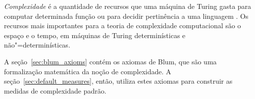 \emph{Complexidade} é a quantidade de recursos
que uma máquina de Turing gasta
para computar determinada função
ou para decidir pertinência a uma linguagem
\cite[p.~285]{HopcroftUllman1979}.
Os recursos mais importantes para a teoria de complexidade computacional
são o espaço e o tempo,
em máquinas de Turing determinísticas e não"=determinísticas.

A seção~\ref{sec:blum_axioms}
contém os axiomas de Blum,
que são uma formalização matemática da noção de complexidade.
A seção~\ref{sec:default_measures},
então,
utiliza estes axiomas para construir as medidas de complexidade padrão.

